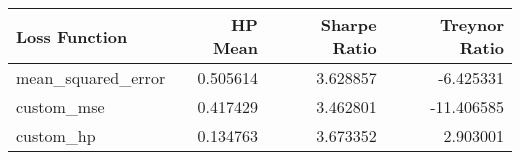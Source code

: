 \begin{tabular}{lrrr}
\toprule
     Loss Function &  HP Mean &  Sharpe Ratio &  Treynor Ratio \\
\midrule
mean\_squared\_error & 0.505614 &      3.628857 &      -6.425331 \\
        custom\_mse & 0.417429 &      3.462801 &     -11.406585 \\
         custom\_hp & 0.134763 &      3.673352 &       2.903001 \\
\bottomrule
\end{tabular}

